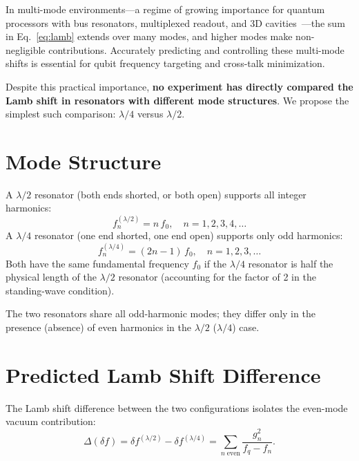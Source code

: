\documentclass[aps,prl,twocolumn,superscriptaddress,nofootinbib]{revtex4-2}
\begin{document}
In multi-mode environments---a regime of growing importance for
quantum processors with bus resonators, multiplexed readout, and
3D cavities~\cite{Paik2011,Reagor2016}---the sum in
Eq.~\eqref{eq:lamb} extends over many modes, and higher modes
make non-negligible contributions.  Accurately predicting and
controlling these multi-mode shifts is essential for qubit
frequency targeting and cross-talk minimization.

Despite this practical importance, \textbf{no experiment has
directly compared the Lamb shift in resonators with different
mode structures}.  We propose the simplest such comparison:
$\lambda/4$ versus $\lambda/2$.

\section{Mode Structure}

A $\lambda/2$ resonator (both ends shorted, or both open) supports
all integer harmonics:
\begin{equation}
  f_n^{(\lambda/2)} = n\,f_0,\quad n=1,2,3,4,\ldots
\end{equation}
A $\lambda/4$ resonator (one end shorted, one end open) supports
only odd harmonics:
\begin{equation}
  f_n^{(\lambda/4)} = (2n{-}1)\,f_0,\quad n=1,2,3,\ldots
\end{equation}
Both have the same fundamental frequency $f_0$ if the $\lambda/4$
resonator is half the physical length of the $\lambda/2$ resonator
(accounting for the factor of 2 in the standing-wave condition).

The two resonators share all odd-harmonic modes; they differ only
in the presence (absence) of even harmonics in the $\lambda/2$
($\lambda/4$) case.

\section{Predicted Lamb Shift Difference}

The Lamb shift difference between the two configurations isolates
the even-mode vacuum contribution:
\begin{equation}\label{eq:diff}
  \Delta(\delta f) = \delta f^{(\lambda/2)} - \delta f^{(\lambda/4)}
  = \sum_{n\;\mathrm{even}} \frac{g_n^2}{f_q - f_n}.
\end{equation}
\end{document}
